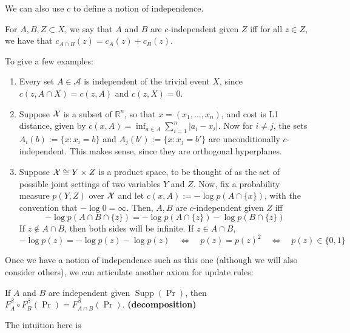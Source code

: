 \documentclass{article}
\DeclareMathOperator{\supp}{\mathrm{Supp}}
\begin{document}
We can also use $c$ to define a notion of independence.

\begin{defn}[$c$-independence]
For $A,B,Z \subset X$,
we say that $A$ and $B$ are $c$-independent given $Z$ iff
for all $z \in Z$, we have that
$c_{A\cap B}(z) = c_{A}(z) + c_{B}(z)$.
\end{defn}

To give a few examples:
\begin{enumerate}
    \item Every set $A \in\mathcal A$ is independent of the trivial event $X$, since
        $
            c(z, A\cap X) = c(z, A)
        $
        and $c(z, X) = 0$.
    \item Suppose $\mathcal X$ is a subset of $\mathbb R^n$, so that $x = (x_1, \ldots, x_n)$, and cost is L1 distance, given by $c(x,A) = \inf_{a \in A} \sum_{i=1}^n {|a_i - x_i|}$. Now for $i\ne j$,
    the sets $A_i(b) := \{ x : x_i = b \}$
    and $A_j(b') := \{x : x_j = b' \}$ are unconditionally $c$-independent.
    This makes sense, since they are orthogonal hyperplanes.

    \item  Suppose $\mathcal X \cong Y \times Z$ is a product space, to be thought of as the set of possible joint settings of two variables $Y$ and $Z$.
    Now, fix a probability measure $p(Y,Z)$ over $\mathcal X$
    and let
    $c(x, A) := -\log p(A \cap \{x\})$, with the convention that $-\log 0 = \infty$.
    Then, $A, B$ are $c$-independent given $Z$ iff
    \[
        - \log p(A \cap B \cap \{z\}) =
        - \log p(A \cap \{z\}) - \log p(B \cap \{z\})
    \]
    If $z \notin A \cap B$, then both sides will be infinite. If $z \in A \cap B$,
    \[
        - \log p(z) = - \log p(z) - \log p(z)
        \quad\iff\quad
        p(z) = p(z)^2
        \quad\iff\quad
        p(z) \in \{0,1\}
    \]
\end{enumerate}

Once we have a notion of independence such as this one (although we will also consider others), we can articulate another axiom for update rules:

\begin{URaxioms}
    \item
    If $A$ and $B$ are independent given $\supp(\Pr)$, then \\
    $F^{\beta}_A \circ F^{\beta}_B (\Pr) = F^{\beta}_{A \cap B}(\Pr)$.
        \hfill \textbf{(decomposition)}

\end{URaxioms}
The intuition here is
\end{document}
